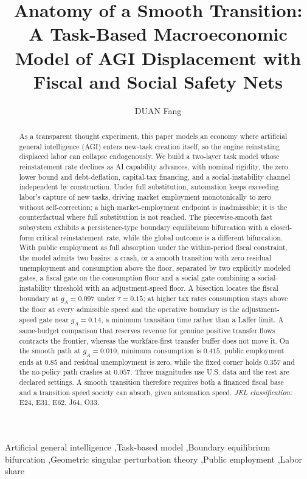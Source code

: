 \documentclass[review,12pt]{elsarticle}
\theoremstyle{plain}
\theoremstyle{definition}
\theoremstyle{remark}
\begin{document}
\begin{frontmatter}

\title{Anatomy of a Smooth Transition: A Task-Based Macroeconomic Model of AGI Displacement with Fiscal and Social Safety Nets}

\author[addr1]{DUAN Fang}
\address[addr1]{College of Information Science and Engineering, Huaqiao University, Xiamen, China}

\begin{abstract}
As a transparent thought experiment, this paper models an economy where artificial general intelligence (AGI) enters new-task creation itself, so the engine reinstating displaced labor can collapse endogenously. We build a two-layer task model whose reinstatement rate declines as AI capability advances, with nominal rigidity, the zero lower bound and debt-deflation, capital-tax financing, and a social-instability channel independent by construction. Under full substitution, automation keeps exceeding labor's capture of new tasks, driving market employment monotonically to zero without self-correction; a high market-employment endpoint is inadmissible; it is the counterfactual where full substitution is not reached. The piecewise-smooth fast subsystem exhibits a persistence-type boundary equilibrium bifurcation with a closed-form critical reinstatement rate, while the global outcome is a different bifurcation. With public employment as full absorption under the within-period fiscal constraint, the model admits two basins: a crash, or a smooth transition with zero residual unemployment and consumption above the floor, separated by two explicitly modeled gates, a fiscal gate on the consumption floor and a social gate combining a social-instability threshold with an adjustment-speed floor. A bisection locates the fiscal boundary at $g_A=0.097$ under $\tau=0.15$; at higher tax rates consumption stays above the floor at every admissible speed and the operative boundary is the adjustment-speed gate near $g_A=0.14$, a minimum transition time rather than a Laffer limit. A same-budget comparison that reserves revenue for genuine positive transfer flows contracts the frontier, whereas the workfare-first transfer buffer does not move it. On the smooth path at $g_A=0.010$, minimum consumption is $0.415$, public employment ends at $0.85$ and residual unemployment is zero, while the fixed corner holds $0.357$ and the no-policy path crashes at $0.057$. Three magnitudes use U.S. data and the rest are declared settings. A smooth transition therefore requires both a financed fiscal base and a transition speed society can absorb, given automation speed.
\vspace{6pt}\noindent\textit{JEL classification:} E24, E31, E62, J64, O33.
\end{abstract}

\begin{keyword}
Artificial general intelligence \sep Task-based model \sep Boundary equilibrium bifurcation \sep Geometric singular perturbation theory \sep Public employment \sep Labor share
\end{keyword}

\end{frontmatter}
\end{document}
